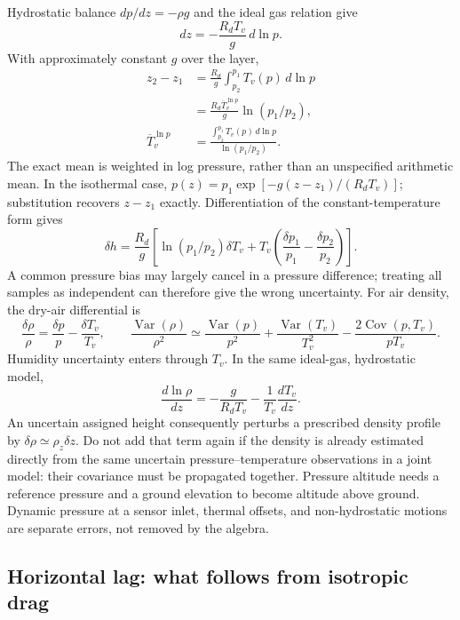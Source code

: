 \documentclass[11pt,a4paper]{article}
\numberwithin{equation}{section}
\begin{document}
Hydrostatic balance $dp/dz=-\rho g$ and the ideal gas relation give
\begin{equation}
 dz=-\frac{R_dT_v}{g}\,d\ln p.
\end{equation}
With approximately constant $g$ over the layer,
\begin{align}
 z_2-z_1&=\frac{R_d}{g}\int_{p_2}^{p_1}T_v(p)\,d\ln p\\
 &=\frac{R_d\overline T_v^{\ln p}}{g}\ln(p_1/p_2),\\
 \overline T_v^{\ln p}&=
 \frac{\int_{p_2}^{p_1}T_v(p)\,d\ln p}{\ln(p_1/p_2)}.
\end{align}
The exact mean is weighted in log pressure, rather than an unspecified
arithmetic mean. In the isothermal case,
$p(z)=p_1\exp[-g(z-z_1)/(R_dT_v)]$; substitution recovers $z-z_1$
exactly. Differentiation of the constant-temperature form gives
\begin{equation}
 \delta h=\frac{R_d}{g}\left[
  \ln(p_1/p_2)\delta T_v+
  T_v\left(\frac{\delta p_1}{p_1}-\frac{\delta p_2}{p_2}\right)\right].
\end{equation}
A common pressure bias may largely cancel in a pressure difference; treating
all samples as independent can therefore give the wrong uncertainty.
For air density, the dry-air differential is
\begin{equation}
 \frac{\delta\rho}{\rho}=\frac{\delta p}{p}-\frac{\delta T_v}{T_v},
 \qquad
 \frac{\operatorname{Var}(\rho)}{\rho^2}\simeq
 \frac{\operatorname{Var}(p)}{p^2}
 +\frac{\operatorname{Var}(T_v)}{T_v^2}
 -\frac{2\operatorname{Cov}(p,T_v)}{pT_v}.
\end{equation}
Humidity uncertainty enters through $T_v$. In the same ideal-gas,
hydrostatic model,
\begin{equation}
 \frac{d\ln\rho}{dz}=-\frac{g}{R_dT_v}
                         -\frac{1}{T_v}\frac{dT_v}{dz}.
\end{equation}
An uncertain assigned height consequently perturbs a prescribed density
profile by $\delta\rho\simeq\rho_z\delta z$. Do not add that term again
if the density is already estimated directly from the same uncertain
pressure--temperature observations in a joint model: their covariance
must be propagated together.
Pressure altitude needs a reference pressure and a ground elevation to
become altitude above ground. Dynamic pressure at a sensor inlet, thermal
offsets, and non-hydrostatic motions are separate errors, not removed by
the algebra.

\subsection{Horizontal lag: what follows from isotropic drag}
\end{document}
